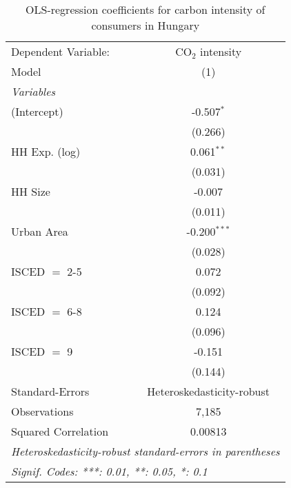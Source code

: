 
\begin{table}[htbp!]
   \centering
   \small
   \begin{adjustbox}{width = 1\textwidth, max height = 0.95\textheight, center}
      \begin{threeparttable}[b]
         \caption{\label{tab:OLS_1_HUN} OLS-regression coefficients for carbon intensity of consumers in Hungary}
         \begin{tabular}{lc}
            \tabularnewline \midrule \midrule
            Dependent Variable: & CO$_{2}$ intensity\\  
            Model               & (1)\\  
            \midrule
            \emph{Variables}\\
            (Intercept)         & -0.507$^{*}$\\   
                                & (0.266)\\   
            HH Exp. (log)       & 0.061$^{**}$\\   
                                & (0.031)\\   
            HH Size             & -0.007\\   
                                & (0.011)\\   
            Urban Area          & -0.200$^{***}$\\   
                                & (0.028)\\   
            ISCED $=$ 2-5       & 0.072\\   
                                & (0.092)\\   
            ISCED $=$ 6-8       & 0.124\\   
                                & (0.096)\\   
            ISCED $=$ 9         & -0.151\\   
                                & (0.144)\\   
            \midrule 
            Standard-Errors     & Heteroskedasticity-robust \\   
            Observations        & 7,185\\  
            Squared Correlation & 0.00813\\  
            \midrule \midrule
            \multicolumn{2}{l}{\emph{Heteroskedasticity-robust standard-errors in parentheses}}\\
            \multicolumn{2}{l}{\emph{Signif. Codes: ***: 0.01, **: 0.05, *: 0.1}}\\
         \end{tabular}
         

\end{threeparttable}
\end{adjustbox}
\end{table}
